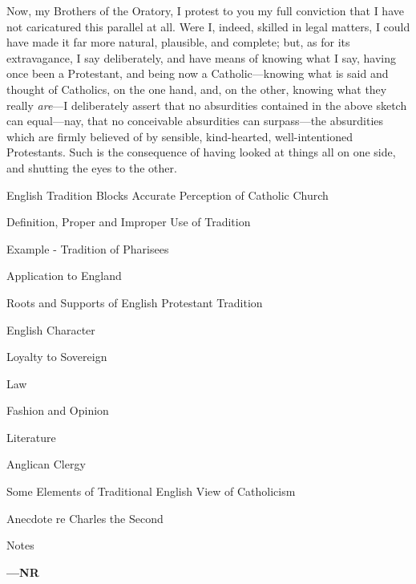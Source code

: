 Now, my Brothers of the Oratory, I protest to you my
full conviction that I have not caricatured this parallel
at all. Were I, indeed, skilled in legal matters, I could
have made it far more natural, plausible, and complete;
but, as for its extravagance, I say deliberately, and
have means of knowing what I say, having once been a
Protestant, and being now a Catholic—knowing what is
said and thought of Catholics, on the one hand, and, on
the other, knowing what they really \emph{are}—I
deliberately assert that no absurdities contained in the
above sketch can equal—nay, that no conceivable
absurdities can surpass—the absurdities which are
firmly believed of by sensible, kind-hearted,
well-intentioned Protestants. Such is the consequence of
having looked at things all on one side, and shutting the
eyes to the other.


English Tradition Blocks
Accurate Perception of Catholic Church

Definition, Proper and
Improper Use of Tradition

Example -
Tradition of Pharisees

Application to
England

Roots and Supports of
English Protestant Tradition

English
Character

Loyalty to
Sovereign

Law

Fashion and
Opinion

Literature

Anglican Clergy

Some Elements of
Traditional English View of Catholicism

Anecdote re Charles the
Second

Notes

\textbf{—NR}

